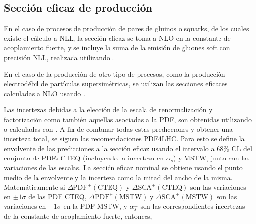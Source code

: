 \subsection{Sección eficaz de producción}
\label{sec:xs_calc}


En el caso de procesos de producción de pares de gluinos o squarks, de los cuales
existe el cálculo a NLL, la sección eficaz se toma a NLO en la constante de acoplamiento
fuerte, y se incluye la suma de la emisión de gluones soft con precisión NLL,
realizada utilizando {\nllfast}\cite{Kramer:2012bx,Beenakker:1996ch,Kulesza:2008jb,Kulesza:2009kq,Beenakker:2009ha,Beenakker:2011fu}.

En el caso de la producción de otro tipo de procesos, como la producción electrodébil de
partículas supersimétricas, se utilizan
las secciones eficaces calculadas a NLO usando {\prospino}.


\newcommand{\pdfcteqpm}{\ensuremath{\Delta\mathrm{PDF}^{\pm}(\mathrm{CTEQ})}}
\newcommand{\scacteqpm}{\ensuremath{\Delta\mathrm{SCA}^{\pm}(\mathrm{CTEQ})}}

\newcommand{\pdfmstwpm}{\ensuremath{\Delta\mathrm{PDF}^{\pm}(\mathrm{MSTW})}}
\newcommand{\scamstwpm}{\ensuremath{\Delta\mathrm{SCA}^{\pm}(\mathrm{MSTW})}}

\newcommand{\alphap}{\ensuremath{\alpha_s_+}}
\newcommand{\alpham}{\ensuremath{\alpha_s^-}}
\newcommand{\alphapm}{\ensuremath{\alpha_s^{\pm}}}

Las incertezas debidas a la elección de la escala de renormalización y
factorización como también aquellas asociadas a la PDF, son obtenidas utilizando {\nllfast} o
calculadas con {\prospino}. A fin de combinar todas estas predicciones y obtener
una incerteza total, se siguen las recomendaciones PDF4LHC\cite{Botje:2011sn}.
Para esto se define la envolvente de las predicciones a la sección eficaz usando
el intervalo a 68\% CL del conjunto de PDFs CTEQ (incluyendo la incerteza en
$\alpha_s$) y MSTW, junto con las variaciones de las escalas. La sección eficaz
nominal se obtiene usando el punto medio de la envolvente y la incerteza como la
mitad del ancho de la misma. Matemáticamente si {\pdfcteqpm} y {\scacteqpm} son
las variaciones en $\pm 1\sigma$ de las PDF CTEQ,  {\pdfmstwpm} y {\scamstwpm}
son las variaciones en $\pm 1\sigma$ en la PDF MSTW, y {\alphapm} son las
correspondientes incertezas de la constante de acoplamiento fuerte, entonces,

